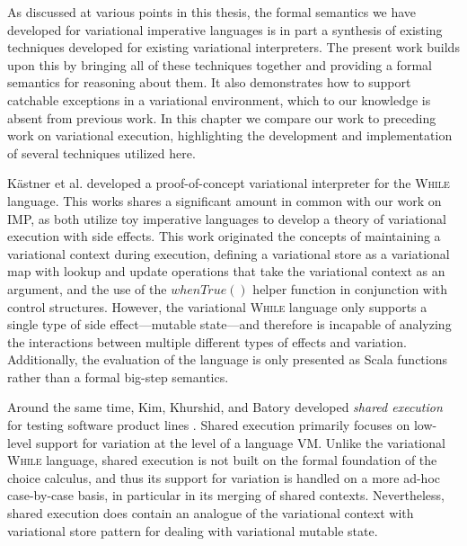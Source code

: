 \documentclass[onehalf,11pt]{beavtex}
\begin{document}
As discussed at various points in this thesis, the formal semantics we have developed for variational imperative languages
is in part a synthesis of existing techniques developed for existing variational interpreters. The present work builds upon this
by bringing all of these techniques together and providing a formal semantics for reasoning about them. It also demonstrates
how to support catchable exceptions in a variational environment, which to our knowledge is absent from previous work.
In this chapter we compare our work to preceding work on variational execution, highlighting the development and implementation
of several techniques utilized here.

 K\"astner et al. \cite{varwhile} developed a proof-of-concept variational interpreter for the \textsc{While} language. This works shares a
 significant amount in common with our work on IMP, as both utilize toy imperative languages to develop a theory of variational execution
 with side effects. This work originated the concepts of maintaining a variational context during execution, defining a variational store as
 a variational map with lookup and update operations that take the variational context as an argument, and the use of the $\mathit{whenTrue}()$
 helper function in conjunction with control structures. However, the variational \textsc{While} language only supports a single type of side
 effect---mutable state---and therefore is incapable of analyzing the interactions between multiple different types of effects and variation.
 Additionally, the evaluation of the language is only presented as Scala functions rather than a formal big-step semantics.
 
 Around the same time, Kim, Khurshid, and Batory developed \emph{shared execution} for testing software product lines \cite{sharedexec}.
 Shared execution primarily focuses on low-level support for variation at the level of a language VM.
 Unlike the variational \textsc{While} language, shared execution is not built on the formal foundation of the choice calculus, and thus its
 support for variation is handled on a more ad-hoc case-by-case basis, in particular in its merging of shared contexts. Nevertheless,
 shared execution does contain an analogue of the variational context with variational store pattern for dealing with variational mutable state.
 
\end{document}
